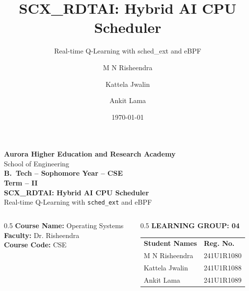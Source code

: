 \documentclass[aspectratio=169]{beamer}
\title{SCX\_RDTAI: Hybrid AI CPU Scheduler}
\subtitle{Real-time Q-Learning with sched\_ext and eBPF}
\author{M N Risheendra \and Kattela Jwalin \and Ankit Lama}
\date{\today}
\begin{document}
{
\begin{frame}[plain]
\vspace{0.3cm}
\begin{center}
{\small \textbf{Aurora Higher Education and Research Academy}}\\
{\small School of Engineering}\\[0.2cm]
{\small \textbf{B.~Tech -- Sophomore Year -- CSE}}\\[0.1cm]
{\small \textbf{Term -- II}}\\[0.4cm]
{\Large \textbf{SCX\_RDTAI: Hybrid AI CPU Scheduler}}\\[0.3cm]
{\normalsize Real-time Q-Learning with \texttt{sched\_ext} and eBPF}\\[0.4cm]
\begin{columns}[T]
\begin{column}{0.5\textwidth}
\small
\textbf{Course Name:} Operating Systems\\
\textbf{Faculty:} Dr. Risheendra\\
\textbf{Course Code:} CSE
\end{column}
\begin{column}{0.5\textwidth}
\small
\textbf{LEARNING GROUP: 04}\\[0.2cm]
\begin{tabular}{ll}
\textbf{Student Names} & \textbf{Reg. No.}\\
M N Risheendra & 241U1R1080\\
Kattela Jwalin & 241U1R1088\\
Ankit Lama & 241U1R1089\\
\end{tabular}
\end{column}
\end{columns}
\end{center}
\end{frame}
}
\end{document}
